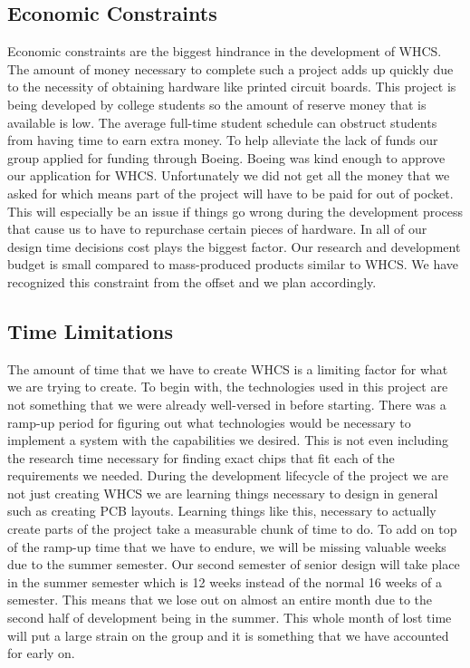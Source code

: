 
\subsection{Economic Constraints}
Economic constraints are the biggest hindrance in the development of WHCS. The
amount of money necessary to complete such a project adds up quickly due to the
necessity of obtaining hardware like printed circuit boards. This project is
being developed by college students so the amount of reserve money that is
available is low. The average full{}-time student schedule can obstruct
students from having time to earn extra money. To help alleviate the lack of
funds our group applied for funding through Boeing. Boeing was kind enough to
approve our application for WHCS. Unfortunately we did not get all the money
that we asked for which means part of the project will have to be paid for out
of pocket.  This will especially be an issue if things go wrong during the
development process that cause us to have to repurchase certain pieces of
hardware. In all of our design time decisions cost plays the biggest factor.
Our research and development budget is small compared to mass{}-produced
products similar to WHCS. We have recognized this constraint from the offset
and we plan accordingly.

\subsection{Time Limitations}
The amount of time that we have to create WHCS is a limiting factor for what we
are trying to create. To begin with, the technologies used in this project are
not something that we were already well{}-versed in before starting. There was
a ramp{}-up period for figuring out what technologies would be necessary to
implement a system with the capabilities we desired. This is not even including
the research time necessary for finding exact chips that fit each of the
requirements we needed. During the development lifecycle of the project we are
not just creating WHCS we are learning things necessary to design in general
such as creating PCB layouts. Learning things like this, necessary to actually
create parts of the project take a measurable chunk of time to do. To add on
top of the ramp{}-up time that we have to endure, we will be missing valuable
weeks due to the summer semester. Our second semester of senior design will
take place in the summer semester which is 12 weeks instead of the normal 16
weeks of a semester. This means that we lose out on almost an entire month due
to the second half of development being in the summer. This whole month of lost
time will put a large strain on the group and it is something that we have
accounted for early on.

